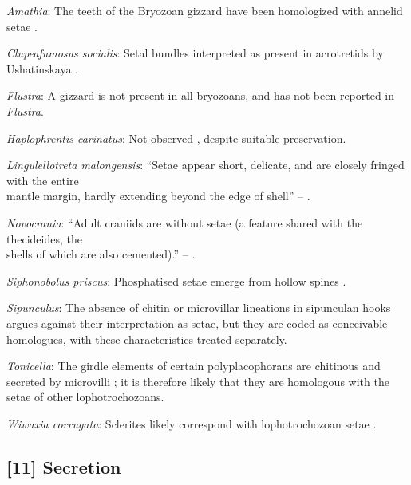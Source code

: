 \documentclass[openany]{book}
\begin{document}
\hypertarget{Amathia-coding-10}{}
\emph{Amathia}: The teeth of the Bryozoan gizzard have been homologized
with annelid setae \citep{Gordon1975}.

\hypertarget{Clupeafumosus_socialis-coding-10}{}
\emph{Clupeafumosus socialis}: Setal bundles interpreted as present in
acrotretids by Ushatinskaya \citeyearpar{Ushatinskaya2016Protegulumand}.

\hypertarget{Flustra-coding-10}{}
\emph{Flustra}: A gizzard is not present in all bryozoans, and has not
been reported in \emph{Flustra}.

\hypertarget{Haplophrentis_carinatus-coding-10}{}
\emph{Haplophrentis carinatus}: Not observed
\citep{Moysiuk2017Hyolithsare}, despite suitable preservation.

\hypertarget{Lingulellotreta_malongensis-coding-10}{}
\emph{Lingulellotreta malongensis}: ``Setae appear short, delicate, and
are closely fringed with the entire\\
mantle margin, hardly extending beyond the edge of shell'' --
\citet{Zhang2005}.

\hypertarget{Novocrania-coding-10}{}
\emph{Novocrania}: ``Adult craniids are without setae (a feature shared
with the thecideides, the\\
shells of which are also cemented).'' -- \citet{Williams2007Supplement}.

\hypertarget{Siphonobolus_priscus-coding-10}{}
\emph{Siphonobolus priscus}: Phosphatised setae emerge from hollow
spines \citep{Popov2009Earlyontogeny}.

\hypertarget{Sipunculus-coding-10}{}
\emph{Sipunculus}: The absence of chitin or microvillar lineations in
sipunculan hooks argues against their interpretation as setae, but they
are coded as conceivable homologues, with these characteristics treated
separately.

\hypertarget{Tonicella-coding-10}{}
\emph{Tonicella}: The girdle elements of certain polyplacophorans are
chitinous and secreted by microvilli
\citep{Fischer1980, Leise1982, Leise1988}; it is therefore likely that
they are homologous with the setae of other lophotrochozoans.

\hypertarget{Wiwaxia_corrugata-coding-10}{}
\emph{Wiwaxia corrugata}: Sclerites likely correspond with
lophotrochozoan setae \citep{Butterfield1990, Smith2014, Zhang2015}.

\subsection*{{[}11{]} Secretion}\label{secretion}
\end{document}
